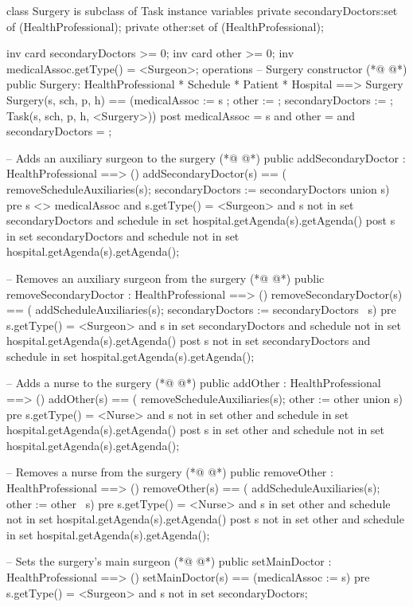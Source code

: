 \begin{vdmpp}[breaklines=true]
class Surgery is subclass of Task
instance variables
  private secondaryDoctors:set of (HealthProfessional);
  private other:set of (HealthProfessional);
  
  inv card secondaryDoctors >= 0;
  inv card other >= 0;
  inv medicalAssoc.getType() = <Surgeon>;
operations
 -- Surgery constructor
(*@
\label{Surgery:11}
@*)
 public Surgery: HealthProfessional * Schedule * Patient * Hospital ==> Surgery
  Surgery(s, sch, p, h) == (medicalAssoc := s ; other := {}; secondaryDoctors := {}; Task(s, sch, p, h, <Surgery>))
 post medicalAssoc = s and other = {} and secondaryDoctors = {};
 
 -- Adds an auxiliary surgeon to the surgery
(*@
\label{addSecondaryDoctor:16}
@*)
 public addSecondaryDoctor : HealthProfessional ==> ()
  addSecondaryDoctor(s) == (
   removeScheduleAuxiliaries(s);
   secondaryDoctors := secondaryDoctors union {s})
 pre s <> medicalAssoc and s.getType() = <Surgeon> and s not in set secondaryDoctors and schedule in set hospital.getAgenda(s).getAgenda()
 post s in set secondaryDoctors and schedule not in set hospital.getAgenda(s).getAgenda();
 
 -- Removes an auxiliary surgeon from the surgery
(*@
\label{removeSecondaryDoctor:24}
@*)
 public removeSecondaryDoctor : HealthProfessional ==> ()
  removeSecondaryDoctor(s) == (
   addScheduleAuxiliaries(s);
   secondaryDoctors := secondaryDoctors \ {s})
 pre s.getType() = <Surgeon> and s in set secondaryDoctors and schedule not in set hospital.getAgenda(s).getAgenda()
 post s not in set secondaryDoctors and schedule in set hospital.getAgenda(s).getAgenda();
 
 -- Adds a nurse to the surgery
(*@
\label{addOther:32}
@*)
 public addOther : HealthProfessional ==> ()
  addOther(s) == (
   removeScheduleAuxiliaries(s);
   other := other union {s})
 pre s.getType() = <Nurse> and s not in set other and schedule in set hospital.getAgenda(s).getAgenda()
 post s in set other and schedule not in set hospital.getAgenda(s).getAgenda();
 
 -- Removes a nurse from the surgery
(*@
\label{removeOther:40}
@*)
 public removeOther : HealthProfessional ==> ()
  removeOther(s) == (
   addScheduleAuxiliaries(s);
   other := other \ {s})
 pre s.getType() = <Nurse> and s in set other and schedule not in set hospital.getAgenda(s).getAgenda()
 post s not in set other and schedule in set hospital.getAgenda(s).getAgenda();
 
 -- Sets the surgery's main surgeon
(*@
\label{setMainDoctor:48}
@*)
 public setMainDoctor : HealthProfessional ==> ()
  setMainDoctor(s) == (medicalAssoc := s)
 pre s.getType() = <Surgeon> and s not in set secondaryDoctors;
 

\end{vdmpp}
